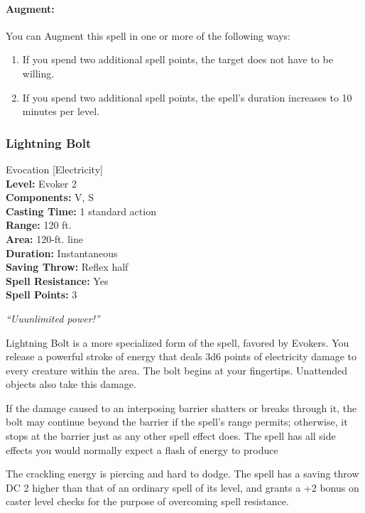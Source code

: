 \paragraph{Augment:} You can Augment this spell in one or more of the following ways:
\begin{enumerate}
 \item If you spend two additional spell points, the target does not have to be willing.
 \item If you spend two additional spell points, the spell's duration increases to 10 minutes per level.
\end{enumerate}
\subsubsection{Lightning Bolt}
\label{Spell:LightningBolt}
Evocation [Electricity]
\\ \textbf{Level:} Evoker 2
\\ \textbf{Components:} V, S
\\ \textbf{Casting Time:} 1 standard action
\\ \textbf{Range:} 120 ft.
\\ \textbf{Area:} 120-ft. line
\\ \textbf{Duration:} Instantaneous
\\ \textbf{Saving Throw:} Reflex half
\\ \textbf{Spell Resistance:} Yes
\\ \textbf{Spell Points:} 3

\emph{``Uuunlimited power!''}

Lightning Bolt is a more specialized form of the  spell, favored by Evokers.
You release a powerful stroke of energy that deals 3d6 points of electricity damage to every creature within the area. 
The bolt begins at your fingertips. Unattended objects also take this damage.

If the damage caused to an interposing barrier shatters or breaks through it, the bolt may continue beyond the barrier if the spell's range permits; otherwise, it stops at the barrier just as any other spell effect does. The spell has all side effects you would normally expect a flash of energy to produce

The crackling energy is piercing and hard to dodge. The spell has a saving throw DC 2 higher than that of an ordinary spell of its level, and grants a +2 bonus on caster level checks for the purpose of overcoming spell resistance.

